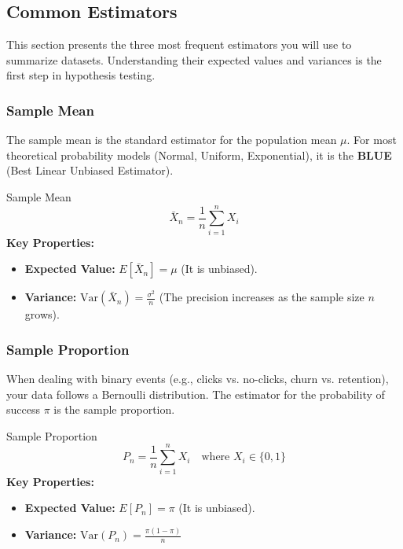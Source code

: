 \documentclass[11pt]{article}
\theoremstyle{smallexample}
\begin{document}
\subsection{Common Estimators}

This section presents the three most frequent estimators you will use to summarize datasets. Understanding their expected values and variances is the first step in hypothesis testing.

\subsubsection{Sample Mean}
The sample mean is the standard estimator for the population mean $\mu$. For most theoretical probability models (Normal, Uniform, Exponential), it is the \textbf{BLUE} (Best Linear Unbiased Estimator).

\begin{defbox}{Sample Mean}
\begin{equation}
\bar{X}_n = \frac{1}{n}\sum_{i=1}^{n} X_i
\end{equation}
\textbf{Key Properties:}
\begin{itemize}
    \item \textbf{Expected Value:} $E[\bar{X}_n] = \mu$ (It is unbiased).
    \item \textbf{Variance:} $\text{Var}(\bar{X}_n) = \frac{\sigma^2}{n}$ (The precision increases as the sample size $n$ grows).
\end{itemize}
\end{defbox}

\subsubsection{Sample Proportion}
When dealing with binary events (e.g., clicks vs. no-clicks, churn vs. retention), your data follows a Bernoulli distribution. The estimator for the probability of success $\pi$ is the sample proportion.

\begin{defbox}{Sample Proportion}
\begin{equation}
P_n = \frac{1}{n}\sum_{i=1}^{n} X_i \quad \text{where } X_i \in \{0, 1\}
\end{equation}
\textbf{Key Properties:}
\begin{itemize}
    \item \textbf{Expected Value:} $E[P_n] = \pi$ (It is unbiased).
    \item \textbf{Variance:} $\text{Var}(P_n) = \frac{\pi(1-\pi)}{n}$
\end{itemize}
\end{defbox}
\end{document}
